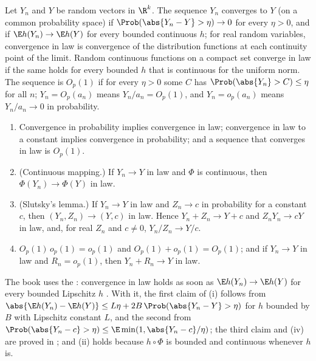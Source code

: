\begin{refsection}
\begin{definition}\label{def:toolkit:convergence}
Let $Y_n$ and $Y$ be random vectors in $\R^k$. The sequence $Y_n$ converges  to $Y$ (on a common probability space) if $\Prob(\abs{Y_n-Y}>\eta)\to0$ for every $\eta>0$, and  if $\E h(Y_n)\to\E h(Y)$ for every bounded continuous $h$; for real random variables, convergence in law is convergence of the distribution functions at each continuity point of the limit. Random continuous functions on a compact set converge in law if the same holds for every bounded $h$ that is continuous for the uniform norm. The sequence is $O_p(1)$ if for every $\eta>0$ some $C$ has $\Prob(\abs{Y_n}>C)\le\eta$ for all $n$; $Y_n=O_p(a_n)$ means $Y_n/a_n=O_p(1)$, and $Y_n=o_p(a_n)$ means $Y_n/a_n\to0$ in probability.
\begin{enumerate}
\item Convergence in probability implies convergence in law; convergence in law to a constant implies convergence in probability; and a sequence that converges in law is $O_p(1)$.
\item (Continuous mapping.) If $Y_n\to Y$ in law and $\Phi$ is continuous, then $\Phi(Y_n)\to\Phi(Y)$ in law.
\item (Slutsky's lemma.) If $Y_n\to Y$ in law and $Z_n\to c$ in probability for a constant $c$, then $(Y_n,Z_n)\to(Y,c)$ in law. Hence $Y_n+Z_n\to Y+c$ and $Z_nY_n\to cY$ in law, and, for real $Z_n$ and $c\ne0$, $Y_n/Z_n\to Y/c$.
\item $O_p(1)\,o_p(1)=o_p(1)$ and $O_p(1)+o_p(1)=O_p(1)$; and if $Y_n\to Y$ in law and $R_n=o_p(1)$, then $Y_n+R_n\to Y$ in law.
\end{enumerate}
\end{definition}

The book uses the : convergence in law holds as soon as $\E h(Y_n)\to\E h(Y)$ for every bounded Lipschitz $h$ \parencite[Lemma~2.2]{vanderVaart1998}. With it, the first claim of (i) follows from $\abs{\E h(Y_n)-\E h(Y)}\le L\eta+2B\,\Prob(\abs{Y_n-Y}>\eta)$ for $h$ bounded by $B$ with Lipschitz constant $L$, and the second from $\Prob(\abs{Y_n-c}>\eta)\le\E\min(1,\abs{Y_n-c}/\eta)$; the third claim and (iv) are proved in \textcite[Chapter~2]{vanderVaart1998}; and (ii) holds because $h\circ\Phi$ is bounded and continuous whenever $h$ is.


\end{refsection}
